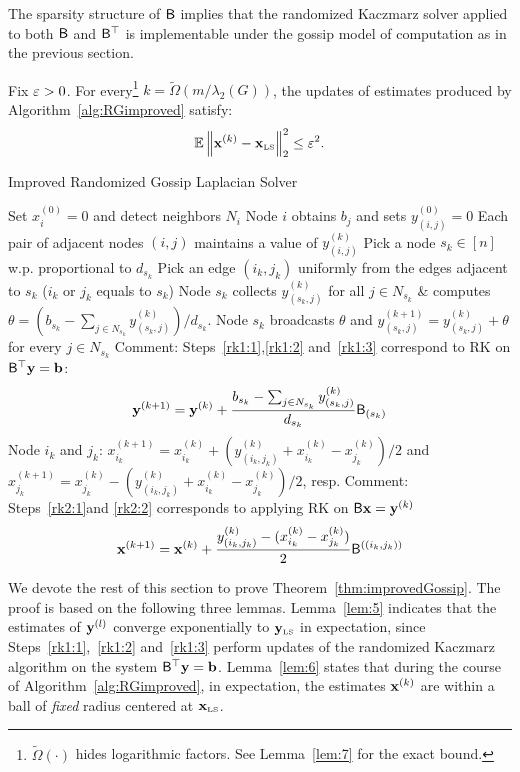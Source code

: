 The sparsity structure of ${\mathsf{B} }$ implies that the randomized Kaczmarz solver applied to both ${\mathsf{B} }$ and ${\mathsf{B} }^\top$ is implementable under the gossip model of computation as in the previous section.
%
%
\begin{theorem}\label{thm:improvedGossip}
Fix $\varepsilon>0$. For every\footnote{$\widetilde{\Omega}(\cdot)$ hides logarithmic factors. See Lemma~\ref{lem:7} for the exact bound.} $k= \widetilde{\Omega}(m /\lambda_2(G))$, the updates of estimates produced by Algorithm~\ref{alg:RGimproved} satisfy:
%
\[ \operatorname{\mathbb{E}} {\left\|\mathbf{x}^{(k)} - \mathbf{x}_{\textrm{\tiny LS}}\right\|_2^2} \leq \varepsilon^2.\]
%
\end{theorem}
%
%
%
\begin{algorithm}{}
	\caption{Improved Randomized Gossip Laplacian Solver}\label{alg:RGimproved}
\begin{algorithmic}[1]
\Procedure{}{}
		\State Set $x^{(0)}_i = 0$ and detect neighbors $N_i$
		\State Node $i$ obtains $b_{j}$ and sets $y^{(0)}_{(i,j)} = 0$
		\State Each pair of adjacent nodes $(i,j)$ maintains a value of $y^{(k)}_{(i,j)}$
\EndFor
{}
		\State \label{rk1:1}Pick a node $s_k\in{[n]}$ w.p. proportional to $d_{s_k}$
		\State \label{rk2:1}Pick an edge $(i_k,j_k)$ uniformly from the edges adjacent to $s_k$ ($i_k$ or $j_k$ equals to $s_k$)
		\State\label{rk1:2} Node $s_k$ collects $y_{(s_k,j)}^{(k)}$ for all $j\in{N_{s_k}}$ \& computes $\theta = (b_{s_k} - \sum_{j\in{N_{s_k}}}y^{(k)}_{(s_k,j)})/d_{s_k} $.
		\Statex
		\State\label{rk1:3} Node $s_k$ broadcasts $\theta$ and  $y_{(s_k,j)}^{(k+1)} = y_{(s_k,j)}^{(k)} + \theta$ for every $j\in{N_{s_k}}$
		\State Comment: Steps~\ref{rk1:1},\ref{rk1:2} and~\ref{rk1:3} correspond to RK on ${\mathsf{B} }^\top \mathbf{y} = {\mathbf b}$:
		\[\mathbf{y}^{(k+1)}  =  \mathbf{y}^{(k)}  + \frac{b_{s_k} - \sum_{j\in{N_{s_k}}}y^{(k)}_{(s_k,j)}  }{d_{s_k}} {\mathsf{B} }_{(s_k)}\]
		\Statex
		\State\label{rk2:2} Node $i_k$ and $j_k$: $x_{i_k}^{(k+1)} = x_{i_k}^{(k)} + (y^{(k)}_{(i_k,j_k)} + x^{(k)}_{i_k} - x^{(k)}_{j_k}) /2 $ and $x_{j_k}^{(k+1)} = x_{j_k}^{(k)} - (y^{(k)}_{(i_k,j_k)} + x^{(k)}_{i_k} - x^{(k)}_{j_k}) /2 $, resp.
	\State Comment: Steps~\ref{rk2:1}and \ref{rk2:2} corresponds to applying RK on ${\mathsf{B} } \mathbf{x} = \mathbf{y}^{(k)}$
	\[\mathbf{x}^{(k+1)} = \mathbf{x}^{(k)}  + \frac{y^{(k)}_{(i_k,j_k)} - (x_{i_k}^{(k)} - x_{j_k}^{(k)})}{2} {\mathsf{B} }^{((i_k,j_k))}\]
\EndFor
\EndProcedure
\end{algorithmic}
\end{algorithm}
%

%
We devote the rest of this section to prove Theorem~\ref{thm:improvedGossip}. The proof is based on the following three lemmas. Lemma~\ref{lem:5} indicates that the estimates of $\mathbf{y}^{(l)}$ converge exponentially to $\mathbf{y}_{\textrm{\tiny LS}}$ in expectation, since Steps~\ref{rk1:1},~\ref{rk1:2} and~\ref{rk1:3} perform updates of the randomized Kaczmarz algorithm on the system ${\mathsf{B} }^\top \mathbf{y} = {\mathbf b}$. Lemma~\ref{lem:6} states that during the course of Algorithm~\ref{alg:RGimproved}, in expectation, the estimates $\mathbf{x}^{(k)}$ are within a ball of \emph{fixed} radius centered at $\mathbf{x}_{\textrm{\tiny LS}}$.


